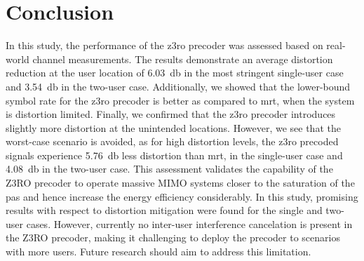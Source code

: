 \documentclass[conference]{IEEEtran}
\newcommand{\update}[1]{{#1}}
\newcommand{\zero}[0]{\gls{z3ro}\xspace}
\newcommand{\zerop}[0]{\zero precoder\xspace}
\newcommand{\mrt}[0]{\gls{mrt}\xspace}
\begin{document}
\section{Conclusion}
In this study, the performance of the \zerop was assessed based on real-world channel measurements. The results demonstrate an average distortion reduction at the user location of \SI{6.03}{\decibel} in the most stringent single-user case and \SI{3.54}{\decibel} in the two-user case. Additionally, we showed that the lower-bound symbol rate for the \zerop is better as compared to \mrt, when the system is distortion limited. Finally, we confirmed that the \zerop introduces slightly more distortion at the unintended locations. However, we see that the worst-case scenario is avoided, as for high distortion levels, the \zero precoded signals experience \SI{5.76}{\decibel} less distortion than \gls{mrt}, in the single-user case and \SI{4.08}{\decibel} in the two-user case. This assessment validates the capability of the Z3RO precoder to operate massive MIMO systems closer to the saturation of the \glspl{pa} and hence increase the energy efficiency considerably. \update{In this study, promising results with respect to distortion mitigation were found for the single and two-user cases. However, currently no inter-user interference cancelation is present in the Z3RO precoder, making it challenging to deploy the precoder to scenarios with more users. Future research should aim to address this limitation.}






\vspace{12pt}
\end{document}
